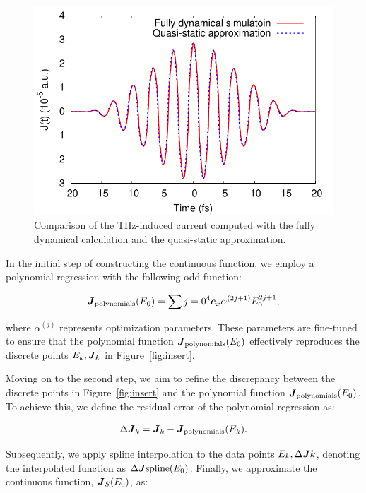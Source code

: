 \begin{figure}[htb]
    \centering
\includegraphics[width=0.8\linewidth]{pic/current_comparison_appendix.pdf}
\caption{\label{fig:current} Comparison of the THz-induced current computed with the fully dynamical calculation and the quasi-static approximation.}
\end{figure}

In the initial step of constructing the continuous function, we employ a polynomial regression with the following odd function:

\begin{align}
\boldsymbol{J}_{\mathrm{polynomials }}(E_0)= \sum\limits{j=0}^{4} \boldsymbol e_x \alpha^{(2j+1)} E^{2j+1}_0,
\label{eq:appendix-polynomial}
\end{align}

where $\alpha^{(j)}$ represents optimization parameters. These parameters are fine-tuned to ensure that the polynomial function $\boldsymbol{J}_{\mathrm{polynomials }}(E_0)$ effectively reproduces the discrete points ${E_k, \boldsymbol J_k}$ in Figure~\ref{fig:insert}.

Moving on to the second step, we aim to refine the discrepancy between the discrete points in Figure~\ref{fig:insert} and the polynomial function $\boldsymbol{J}_{\mathrm{polynomials }}(E_0)$. To achieve this, we define the residual error of the polynomial regression as:

\begin{align}
\Delta \boldsymbol{J}_k=\boldsymbol{J}_{k}-\boldsymbol{J}_{\mathrm{polynomials}}(E_k).
\end{align}

Subsequently, we apply spline interpolation to the data points ${E_k, \Delta \boldsymbol{J}k}$, denoting the interpolated function as $\Delta \boldsymbol{J}{\mathrm{spline}}(E_0)$. Finally, we approximate the continuous function, $\boldsymbol J_S(E_0)$, as:

